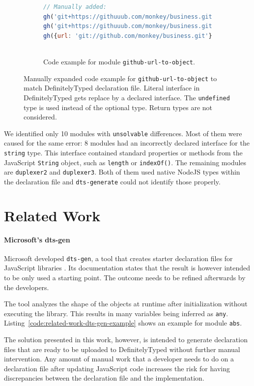 \documentclass[a4paper,english,cleveref, autoref]{lipics-v2019}
\newcommand{\coderef}[1]{Listing~\ref{#1}}
\begin{document}
\begin{figure}[tp]
\begin{subfigure}{0.80\linewidth}
\begin{lstlisting}[language=JavaScript]
// Manually added:
gh('git+https://githuuub.com/monkey/business.git', {});
gh('git+https://githuuub.com/monkey/business.git', {enterprise: true});
gh({url: 'git://github.com/monkey/business.git'});
      
    \end{lstlisting}
    \caption{Code example for module \texttt{github-url-to-object}.}
    \end{subfigure}
  \caption{Manually expanded code example for \texttt{github-url-to-object} to match DefinitelyTyped declaration file. Literal interface in DefinitelyTyped gets replace by a declared interface. The \texttt{undefined} type is used instead of the optional type. Return types are not considered.}
  \label{fig:experiments-results-manually-completed-examples}
\end{figure}

We identified only 10 modules with \texttt{unsolvable} differences. Most of them were caused for the same error: 8 modules had an incorrectly declared interface for the \texttt{string} type. This interface contained standard properties or methods from the JavaScript \texttt{String} object, such as \texttt{length} or \texttt{indexOf()}. The remaining modules are \texttt{duplexer2} and \texttt{duplexer3}. Both of them used native NodeJS types within the declaration file and \texttt{dts-generate} could not identify those properly.


\section{Related Work}
\label{sec:related-work}
\paragraph*{Microsoft's dts-gen}
Microsoft developed \texttt{dts-gen}, a tool that creates starter declaration files for JavaScript libraries \cite{dts-gen}. Its documentation states that the result is however intended to be only used a starting point. The outcome needs to be refined afterwards by the developers.

The tool analyzes the shape of the objects at runtime after initialization without executing the library. This results in many variables being inferred as \lstinline[language={}]{any}. \coderef{code:related-work-dts-gen-example} shows an example for module \lstinline[language={}]{abs}.

The solution presented in this work, however, is intended to generate declaration files that are ready to be uploaded to DefinitelyTyped without further manual intervention. Any amount of manual work that a developer needs to do on a declaration file after updating JavaScript code increases the risk for having discrepancies between the declaration file and the implementation.
\end{document}
